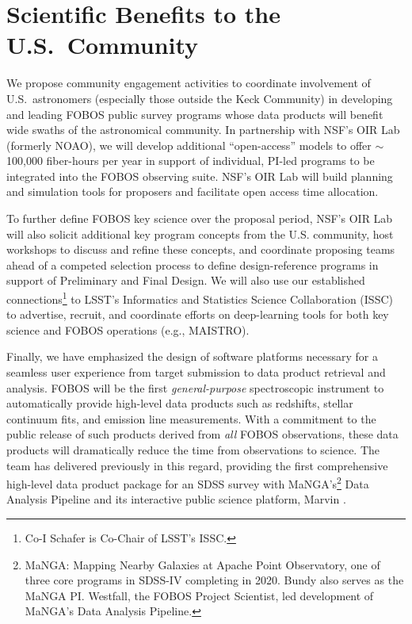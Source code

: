 \documentclass[oneside,11pt]{amsart}
\begin{document}
\section{Scientific Benefits to the U.S.\ Community}

We propose community engagement activities to coordinate involvement
of U.S.~astronomers (especially those outside the Keck Community) in
developing and leading FOBOS public survey programs whose data
products will benefit wide swaths of the astronomical community. In
partnership with NSF's OIR Lab (formerly NOAO), we will develop
additional ``open-access'' models to offer $\sim$100,000 fiber-hours
per year in support of individual, PI-led programs to be integrated
into the FOBOS observing suite. NSF's OIR Lab will build planning and
simulation tools for proposers and facilitate open access time
allocation.

To further define FOBOS key science over the proposal period, NSF's
OIR Lab will also solicit additional key program concepts from the
U.S. community, host workshops to discuss and refine these concepts,
and coordinate proposing teams ahead of a competed selection process
to define design-reference programs in support of Preliminary and
Final Design. We will also use our established
connections\footnote{Co-I Schafer is Co-Chair of LSST's ISSC.} to
LSST's Informatics and Statistics Science Collaboration (ISSC) to
advertise, recruit, and coordinate efforts on deep-learning tools for
both key science and FOBOS operations (e.g., MAISTRO).

Finally, we have emphasized the design of software platforms
necessary for a seamless user experience from target submission to
data product retrieval and analysis. FOBOS will be the first
\emph{general-purpose} spectroscopic instrument to automatically
provide high-level data products such as redshifts, stellar continuum
fits, and emission line measurements. With a commitment to the public
release of such products derived from \emph{all} FOBOS observations,
these data products will dramatically reduce the time from
observations to science. The team has delivered previously in this
regard, providing the first comprehensive high-level data product
package for an SDSS survey with MaNGA's\footnote{MaNGA: Mapping
Nearby Galaxies at Apache Point Observatory, one of three core
programs in SDSS-IV completing in 2020. Bundy also serves as the
MaNGA PI. Westfall, the FOBOS Project Scientist, led development of
MaNGA's Data Analysis Pipeline.} Data Analysis Pipeline
\citep{westfall19} and its interactive public science platform,
Marvin \citep{cherinka19}.
\end{document}
